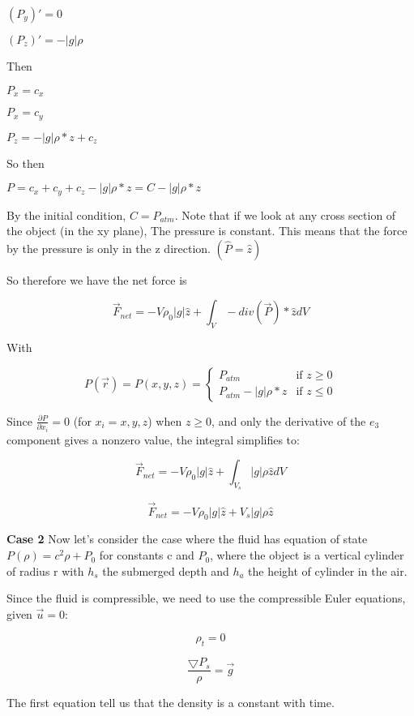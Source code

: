 \documentclass{article}
\begin{document}
$(P_y)' = 0$

$(P_z)' = -|g|\rho$

Then

$P_x = c_x$

$P_x = c_y$

$P_z = -|g|\rho*z + c_z$

So then 

$P = c_x + c_y + c_z -|g|\rho*z = C - |g|\rho*z$

By the initial condition, $C = P_{atm}$. Note that if we look at any cross section of the object (in the xy plane), The pressure is constant. This means that the force by the pressure is only in the z direction. $(\hat{P} = \hat{z})$

So therefore we have the net force is

$$\vec{F}_{net} =  - V \rho_0|g| \hat{z} + \int_{V} -div(\vec{P})*\hat{z}  dV $$

With 

\begin{equation*}
P(\vec{r}) = P(x, y, z) =
\begin{cases}
P_{atm} & \text{if $z\ge 0$}\\
P_{atm} - |g|\rho*z & \text{if $z\le 0$}
\end{cases}
\end{equation*}

Since $ \frac{\partial P}{\partial x_i}  = 0$ (for $x_i = x, y, z$) when $z \ge 0$, and only the derivative of the $e_3$ component gives a nonzero value, the integral simplifies to:

$$\vec{F}_{net} =  - V \rho_0|g| \hat{z} + \int_{V_s} |g|\rho\hat{z} dV $$

$$\vec{F}_{net} =  - V \rho_0|g| \hat{z} + V_s|g|\rho \hat{z}$$

\vspace{2.9cm}

\textbf{Case 2}  Now let's consider the case where the fluid has equation of state $P(\rho) = c^2\rho + P_0$
for constants c and $P_0$, where the object is a vertical cylinder of radius r with $h_s$ the
submerged depth and $h_a$ the height of cylinder in the air.

Since the fluid is compressible, we need to use the compressible Euler equations, given $\vec{u} = 0$: 

$$\rho_t = 0$$

$$\frac{\bigtriangledown P_s}{\rho} = \vec{g}$$

The first equation tell us that the density is a constant with time. 
\end{document}
